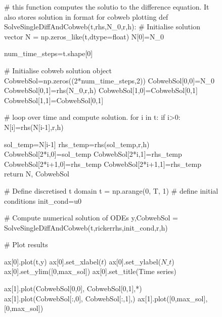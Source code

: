 \documentclass[
  letterpaper,
  DIV=11,
  numbers=noendperiod]{scrreprt}
\newenvironment{Shaded}{\begin{snugshade}}{\end{snugshade}}
\newcommand{\NormalTok}[1]{\textcolor[rgb]{0.00,0.23,0.31}{#1}}
\begin{document}
\begin{figure}
{\begin{Shaded}
\begin{Highlighting}[]
\NormalTok{        \# this function computes the solutio to the difference equation. It also stores solution in format for cobweb plotting}
\NormalTok{        def SolveSingleDiffAndCobweb(t,rhs,N\_0,r,h):}
\NormalTok{          \# Initialise solution vector}
\NormalTok{          N = np.zeros\_like(t,dtype=float)}
\NormalTok{          N[0]=N\_0}


\NormalTok{          num\_time\_steps=t.shape[0]}


\NormalTok{          \# Initialise cobweb solution object}
\NormalTok{          CobwebSol=np.zeros((2*num\_time\_steps,2))}
\NormalTok{          CobwebSol[0,0]=N\_0}
\NormalTok{          CobwebSol[0,1]=rhs(N\_0,r,h)}
\NormalTok{          CobwebSol[1,0]=CobwebSol[0,1]}
\NormalTok{          CobwebSol[1,1]=CobwebSol[0,1]}

\NormalTok{          \# loop over time and compute solution.}
\NormalTok{          for i in t:}
\NormalTok{            if i\textgreater{}0:}
\NormalTok{              N[i]=rhs(N[i{-}1],r,h) }

\NormalTok{              sol\_temp=N[i{-}1]}
\NormalTok{              rhs\_temp=rhs(sol\_temp,r,h)}
\NormalTok{              CobwebSol[2*i,0]=sol\_temp}
\NormalTok{              CobwebSol[2*i,1]=rhs\_temp}
\NormalTok{              CobwebSol[2*i+1,0]=rhs\_temp}
\NormalTok{              CobwebSol[2*i+1,1]=rhs\_temp}
\NormalTok{          return N, CobwebSol}

\NormalTok{        \# Define discretised t domain}
\NormalTok{        t = np.arange(0, T, 1)}
\NormalTok{        \# define initial conditions}
\NormalTok{        init\_cond=u0}
        
\NormalTok{        \# Compute numerical solution of ODEs}
\NormalTok{        y,CobwebSol = SolveSingleDiffAndCobweb(t,rickerrhs,init\_cond,r,h)}

\NormalTok{        \# Plot results}
        
\NormalTok{        ax[0].plot(t,y)}
\NormalTok{        ax[0].set\_xlabel(\textquotesingle{}$t$\textquotesingle{})}
\NormalTok{        ax[0].set\_ylabel(\textquotesingle{}$N\_t$\textquotesingle{})}
\NormalTok{        ax[0].set\_ylim([0,max\_sol])}
\NormalTok{        ax[0].set\_title(\textquotesingle{}Time series\textquotesingle{})}


\NormalTok{        ax[1].plot(CobwebSol[0,0], CobwebSol[0,1],\textquotesingle{}*\textquotesingle{})}
\NormalTok{        ax[1].plot(CobwebSol[:,0], CobwebSol[:,1],\textquotesingle{}{-}\textquotesingle{})}
\NormalTok{        ax[1].plot([0,max\_sol],[0,max\_sol])}


\end{Highlighting}
\end{Shaded}}
\end{figure}
\end{document}
